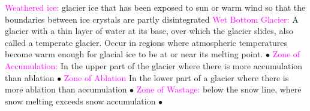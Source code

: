 \documentclass{article}
\newcommand{\ddd}{$\bullet$}
\newcommand{\pink}[1]{\textcolor{magenta}{#1}}
\newcommand{\vocab}[1]{{\pink{#1}}}
\begin{document}
\begin{multicols*}{4}
		\vocab{        Weathered ice: } glacier ice that has been exposed to sun or warm wind so that the boundaries between ice crystals are partly disintegrated
		\vocab{Wet Bottom Glacier: } A glacier with a thin layer of water at its base, over which the glacier slides, also called a temperate glacier. Occur in regions where atmospheric temperatures become warm enough for glacial ice to be at or near its melting point. \ddd
		\vocab{Zone of Accumulation: } In the upper part of the glacier where there is more accumulation than ablation \ddd
		\vocab{Zone of Ablation} In the lower part of a glacier where there is more ablation than accumulation \ddd
		\vocab{Zone of Wastage: } below the snow line, where snow melting exceeds snow accumulation \ddd

	   	
	\end{multicols*}
\end{document}
